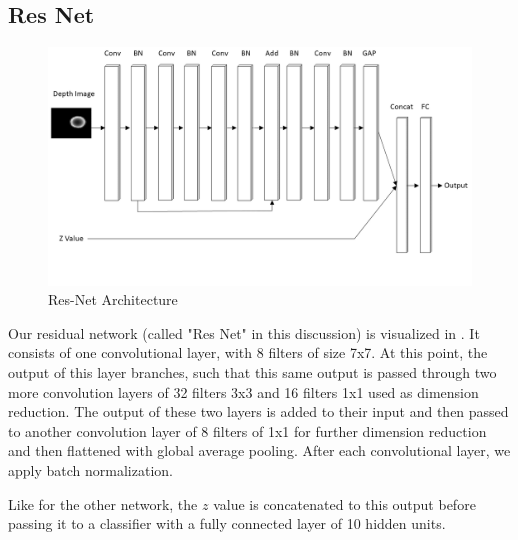 \subsection{Res Net}

\begin{figure}[t!]
    \includegraphics[width=0.99\columnwidth]{figs/res_net.png}
\caption{Res-Net Architecture} \label{fig:res_net}
\end{figure}

Our residual network (called "Res Net" in this discussion) is visualized in . 
It consists of one convolutional layer, with 8 filters of size 7x7.
At this point, the output of this layer branches, such that this same output is passed through two more convolution layers of 32 filters 3x3 and 16 filters 1x1 used as dimension reduction. 
The output of these two layers is added to their input and then passed to another convolution layer of 8 filters of 1x1 for further dimension reduction and then flattened with global average pooling. 
After each convolutional layer, we apply batch normalization. 

Like for the other network, the $z$ value is concatenated to this output before passing it to a classifier with a fully connected layer of 10 hidden units.


